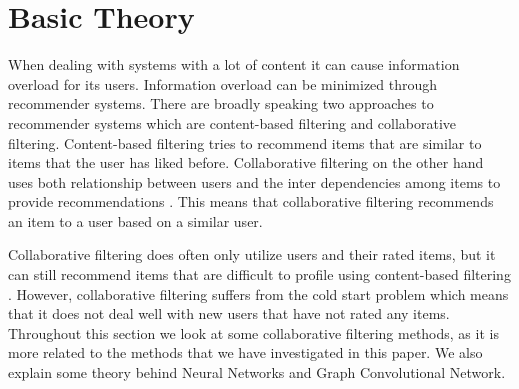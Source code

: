 \section{Basic Theory}\label{app:basic-theory}
When dealing with systems with a lot of content it can cause information overload for its users.
Information overload can be minimized through recommender systems.
There are broadly speaking two approaches to recommender systems which are content-based filtering and collaborative filtering.
Content-based filtering tries to recommend items that are similar to items that the user has liked before.
Collaborative filtering on the other hand uses both relationship between users and the inter dependencies among items to provide recommendations \cite{Matrix-factorization-techniques}.
This means that collaborative filtering recommends an item to a user based on a similar user.

Collaborative filtering does often only utilize users and their rated items, but it can still recommend items that are difficult to profile using content-based filtering \cite{Matrix-factorization-techniques}.
However, collaborative filtering suffers from the cold start problem which means that it does not deal well with new users that have not rated any items.
Throughout this section we look at some collaborative filtering methods, as it is more related to the methods that we have investigated in this paper.
We also explain some theory behind Neural Networks and Graph Convolutional Network.


